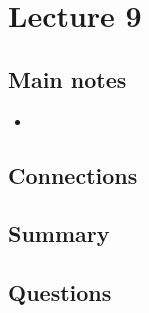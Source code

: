 \section{Lecture 9}

\subsection{Main notes}


\begin{itemize}
	\item
\end{itemize}


\subsection{Connections}


\subsection{Summary}


\subsection{Questions}
